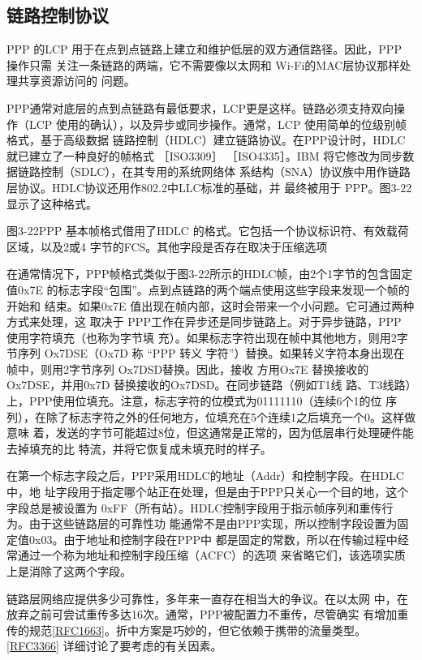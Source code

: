 \subsection{链路控制协议}

PPP 的LCP 用于在点到点链路上建立和维护低层的双方通信路径。因此，PPP 操作只需
关注一条链路的两端，它不需要像以太网和 Wi-Fi的MAC层协议那样处理共享资源访问的
问题。

PPP通常对底层的点到点链路有最低要求，LCP更是这样。链路必须支持双向操作（LCP
使用的确认），以及异步或同步操作。通常，LCP 使用简单的位级别帧格式，基于高级数据
链路控制（HDLC）建立链路协议。在PPP设计时，HDLC就已建立了一种良好的帧格式
［ISO3309］ ［ISO4335］。IBM 将它修改为同步数据链路控制（SDLC），在其专用的系统网络体
系结构（SNA）协议族中用作链路层协议。HDLC协议还用作802.2中LLC标准的基础，并
最终被用于 PPP。图3-22显示了这种格式。

图3-22PPP 基本帧格式借用了HDLC 的格式。它包括一个协议标识符、有效载荷区域，以及2或4
字节的FCS。其他字段是否存在取决于压缩选项

在通常情况下，PPP帧格式类似于图3-22所示的HDLC帧，由2个1字节的包含固定
值0x7E 的标志字段“包围”。点到点链路的两个端点使用这些字段来发现一个帧的开始和
结束。如果0x7E 值出现在帧内部，这时会带来一个小问题。它可通过两种方式来处理，这
取决于 PPP工作在异步还是同步链路上。对于异步链路，PPP 使用字符填充（也称为字节填
充）。如果标志字符出现在帧中其他地方，则用2字节序列 Ox7DSE（Ox7D 称 “PPP 转义
字符”）替换。如果转义字符本身出现在帧中，则用2字节序列 Ox7DSD替换。因此，接收
方用Ox7E 替换接收的Ox7DSE，并用0x7D 替换接收的Ox7DSD。在同步链路（例如T1线
路、T3线路）上，PPP使用位填充。注意，标志字符的位模式为01111110（连续6个1的位
序列），在除了标志字符之外的任何地方，位填充在5个连续1之后填充一个0。这样做意味
着，发送的字节可能超过8位，但这通常是正常的，因为低层串行处理硬件能去掉填充的比
特流，并将它恢复成未填充时的样子。

在第一个标志字段之后，PPP采用HDLC的地址（Addr）和控制字段。在HDLC中，地
址字段用于指定哪个站正在处理，但是由于PPP只关心一个目的地，这个字段总是被设置为
0xFF（所有站）。HDLC控制字段用于指示帧序列和重传行为。由于这些链路层的可靠性功
能通常不是由PPP实现，所以控制字段设置为固定值0x03。由于地址和控制字段在PPP中
都是固定的常数，所以在传输过程中经常通过一个称为地址和控制字段压缩（ACFC）的选项
来省略它们，该选项实质上是消除了这两个字段。

\begin{tcolorbox}
    链路层网络应提供多少可靠性，多年来一直存在相当大的争议。在以太网
    中，在放弃之前可尝试重传多达16次。通常，PPP被配置力不重传，尽管确实
    有增加重传的规范\href{https://www.rfc-editor.org/rfc/rfc1663}{[RFC1663]}。折中方案是巧妙的，但它依赖于携带的流量类型。
    \href{https://www.rfc-editor.org/rfc/rfc3366}{[RFC3366]} 详细讨论了要考虑的有关因素。
\end{tcolorbox}

